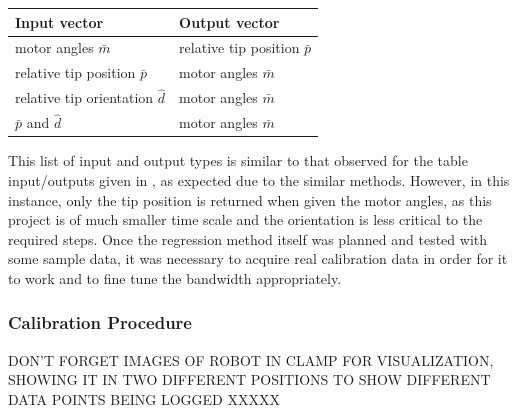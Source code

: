 \documentclass[11pt]{article}
\begin{document}
\begin{center}
\label{table:regressionOutputs}
\begin{tabularx}{0.66\textwidth}{ | >{\centering\arraybackslash}p{12em} |>{\centering\arraybackslash}X|} 
\hline
Input vector & Output vector\\
\hline
motor angles $\bar{m}$ & relative tip position $\bar{p}$ \\
relative tip position $\bar{p}$ & motor angles $\bar{m}$ \\
relative tip orientation $\hat{d}$ & motor angles $\bar{m}$ \\
$\bar{p}$ and $\hat{d}$ & motor angles $\bar{m}$\\
\hline
\end{tabularx}
\end{center}

This list of input and output types is similar to that observed for the table input/outputs given in \cite{GreggSmithDesign}, as expected due to the similar methods. However, in this instance, only the tip position is returned when given the motor angles, as this project is of much smaller time scale and the orientation is less critical to the required steps. Once the regression method itself was planned and tested with some sample data, it was necessary to acquire real calibration data in order for it to work and to fine tune the bandwidth appropriately.


\subsubsection{Calibration Procedure}
\label{section:calibrationProcedure}


DON'T FORGET IMAGES OF ROBOT IN CLAMP FOR VISUALIZATION, SHOWING IT IN TWO DIFFERENT POSITIONS TO SHOW DIFFERENT DATA POINTS BEING LOGGED XXXXX
\end{document}

